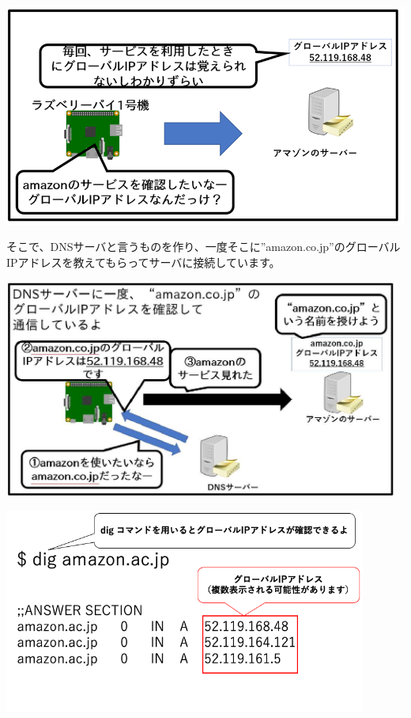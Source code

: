 \documentclass[a4paper,12pt,dvipdfmx]{jarticle}
\begin{document}
\centering
\includegraphics[width=15.004cm]{ome7-img026.png}
\flushleft

そこで、DNSサーバと言うものを作り、一度そこに”amazon.co.jp”のグローバルIPアドレスを教えてもらってサーバに接続しています。



\centering
\includegraphics[width=13.051cm]{ome7-img027}
\flushleft



\bigskip

\clearpage

\centering
\includegraphics[width=11.924cm]{ome7-img028.png}
\flushleft
\end{document}
